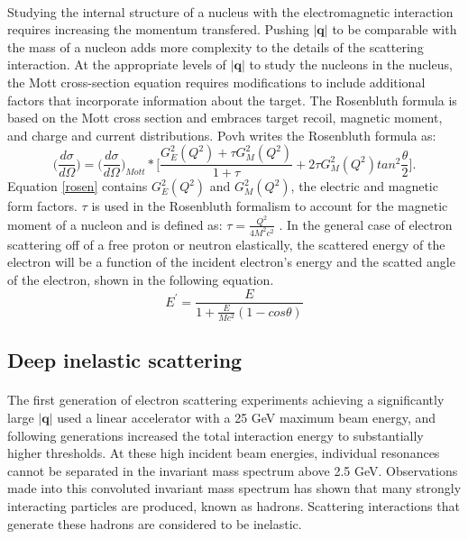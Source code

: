 \paragraph{} Studying the internal structure of a nucleus with the electromagnetic interaction requires increasing the momentum transfered. Pushing $|\boldsymbol{q}|$ to be comparable with the mass of a nucleon adds more complexity to the details of the scattering interaction. At the appropriate levels of $|\boldsymbol{q}|$ to study the nucleons in the nucleus, the Mott cross-section equation requires modifications to include additional factors that incorporate information about the target. The Rosenbluth formula is based on the Mott cross section and embraces target recoil, magnetic moment, and charge and current distributions. Povh writes the Rosenbluth formula as:
\begin{equation}
\label{rosen}
\bigg(\frac{d\sigma}{d\Omega}\bigg)=\bigg(\frac{d\sigma}{d\Omega}\bigg)_{Mott} *\bigg\lbrack \frac{G^2_E(Q^2) +\tau G^2_M(Q^2)}{1+\tau} + 2\tau G^2_M(Q^2)tan^2\frac{\theta}{2} \bigg\rbrack.
\end{equation}
Equation \ref{rosen} contains $G^2_E(Q^2)$ and $G^2_M(Q^2)$, the electric and magnetic form factors. $\tau$ is used in the Rosenbluth formalism to account for the magnetic moment of a nucleon and is defined as: $\tau = \frac{Q^2}{4M^2c^2}$ \cite{PnN}. In the general case of electron scattering off of a free proton or neutron elastically, the scattered energy of the electron will be a function of the incident electron's energy and the scatted angle of the electron, shown in the following equation.
\begin{equation}
E^\prime =\frac{E}{1+\frac{E}{Mc^2}(1-cos\theta)}
\end{equation}



\subsection{Deep inelastic scattering}
\paragraph{}The first generation of electron scattering experiments achieving a significantly large  $|\boldsymbol{q}|$ used a linear accelerator with a 25 GeV maximum beam energy, and following generations increased the total interaction energy to substantially higher thresholds. At these high incident beam energies, individual resonances cannot be separated in the invariant mass spectrum above 2.5 GeV. Observations made into this convoluted invariant mass spectrum has shown that many strongly interacting particles are produced, known as hadrons. Scattering interactions that generate these hadrons are considered to be inelastic. 
